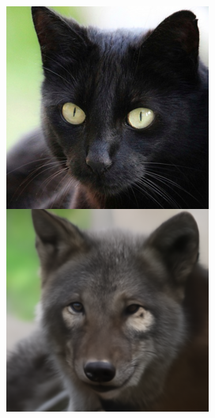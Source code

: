 \documentclass{article}
\begin{document}
\begin{figure}
\begin{minipage}[t]{0.48\textwidth}
\begin{minipage}[t]{0.19\textwidth}
        \end{minipage}
        \begin{minipage}[t]{0.19\textwidth}
            \includegraphics[width=\linewidth]{img/afhq_main/afhq256_fwd_7.png}
        \end{minipage}

\end{minipage}
\end{figure}
\end{document}
